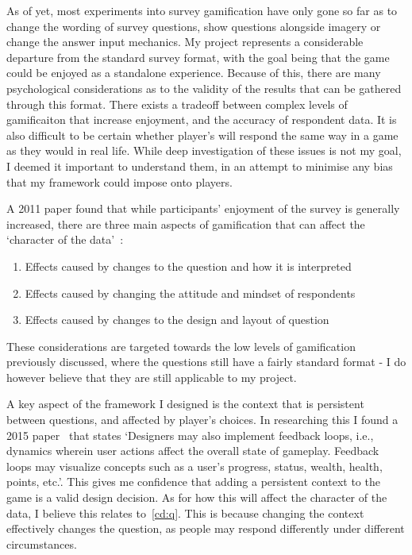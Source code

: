 As of yet, most experiments into survey gamification have only gone so far as to change the wording of survey questions, show questions alongside imagery or change the answer input mechanics.
My project represents a considerable departure from the standard survey format, with the goal being that the game could be enjoyed as a standalone experience. 
Because of this, there are many psychological considerations as to the validity of the results that can be gathered through this format. There exists a tradeoff between complex levels of gamificaiton that increase enjoyment, and the accuracy of respondent data. It is also difficult to be certain whether player's will respond the same way in a game as they would in real life.
While deep investigation of these issues is not my goal, I deemed it important to understand them, in an attempt to minimise any bias that my framework could impose onto players.

A 2011 paper found that while participants' enjoyment of the survey is generally increased, there are three main aspects of gamification that can affect the `character of the data'~\cite{GameExperiments}:
\begin{enumerate}[label=\textbf{cotd.\arabic*}]
    \item\label{cd:q} Effects caused by changes to the question and how it is interpreted
    \item\label{cd:m} Effects caused by changing the attitude and mindset of respondents
    \item\label{cd:l} Effects caused by changes to the design and layout of question
\end{enumerate}
These considerations are targeted towards the low levels of gamification previously discussed, where the questions still have a fairly standard format - I do however believe that they are still applicable to my project. 

A key aspect of the framework I designed is the context that is persistent between questions, and affected by player's choices. In researching this I found a 2015 paper~\cite{Olympic} that states `Designers may also implement feedback loops, i.e., dynamics wherein user actions affect the overall state of gameplay. Feedback loops may visualize concepts such as a user’s progress, status, wealth, health, points, etc.'. 
This gives me confidence that adding a persistent context to the game is a valid design decision.
As for how this will affect the character of the data, I believe this relates to~\ref{cd:q}. 
This is because changing the context effectively changes the question, as people may respond differently under different circumstances. 

